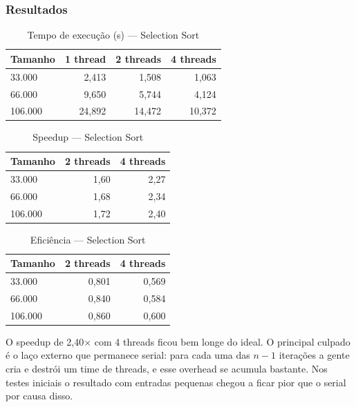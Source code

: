 \documentclass[12pt]{article}
\begin{document}
\subsubsection{Resultados}

\begin{table}[H]
\centering
\caption{Tempo de execução (s) --- Selection Sort}
\begin{tabular}{lrrr}
\toprule
\textbf{Tamanho} & \textbf{1 thread} & \textbf{2 threads} & \textbf{4 threads} \\
\midrule
33.000 & 2,413 & 1,508 & 1,063 \\
66.000 & 9,650 & 5,744 & 4,124 \\
106.000 & 24,892 & 14,472 & 10,372 \\
\bottomrule
\end{tabular}
\end{table}

\begin{table}[H]
\centering
\caption{Speedup --- Selection Sort}
\begin{tabular}{lrr}
\toprule
\textbf{Tamanho} & \textbf{2 threads} & \textbf{4 threads} \\
\midrule
33.000 & 1,60 & 2,27 \\
66.000 & 1,68 & 2,34 \\
106.000 & 1,72 & 2,40 \\
\bottomrule
\end{tabular}
\end{table}

\begin{table}[H]
\centering
\caption{Eficiência --- Selection Sort}
\begin{tabular}{lrr}
\toprule
\textbf{Tamanho} & \textbf{2 threads} & \textbf{4 threads} \\
\midrule
33.000 & 0,801 & 0,569 \\
66.000 & 0,840 & 0,584 \\
106.000 & 0,860 & 0,600 \\
\bottomrule
\end{tabular}
\end{table}

O speedup de 2,40× com 4 threads ficou bem longe do ideal. O principal culpado é o laço externo que permanece serial: para cada uma das $n-1$ iterações a gente cria e destrói um time de threads, e esse overhead se acumula bastante. Nos testes iniciais o resultado com entradas pequenas chegou a ficar pior que o serial por causa disso.

\end{document}
